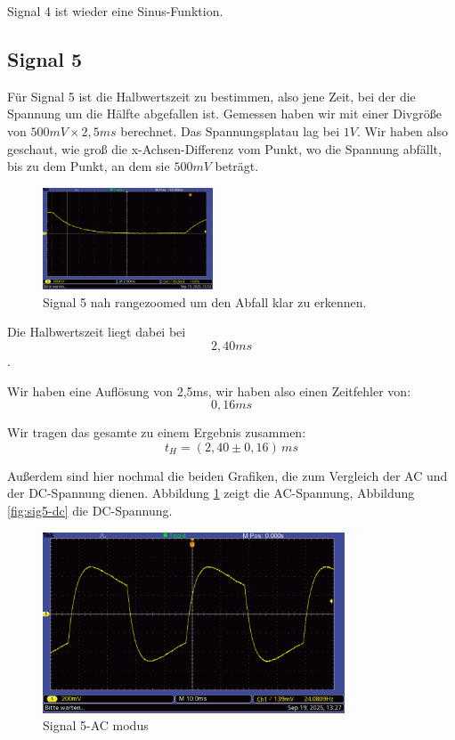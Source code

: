 Signal 4 ist wieder eine Sinus-Funktion.

\newpage

\subsection*{Signal 5}

Für Signal 5 ist die Halbwertszeit zu bestimmen, also jene Zeit, bei der die Spannung um die Hälfte abgefallen ist.
Gemessen haben wir mit einer Divgröße von $500mV \times 2,5ms$ berechnet. Das Spannungsplatau lag bei $1V$. Wir haben also geschaut, wie groß die x-Achsen-Differenz vom Punkt, wo die Spannung abfällt, bis zu dem Punkt, an dem sie $500mV$ beträgt.

\begin{figure} [h!]
    \centering
        \includegraphics[width=0.45\textwidth]{img/25/Signale2/Signal5-Clean.pdf}
    \caption{Signal 5 nah rangezoomed um den Abfall klar zu erkennen.}
\end{figure}

Die Halbwertszeit liegt dabei bei 
\begin{equation}
    2,40 ms
\end{equation}.

Wir haben eine Auflösung von 2,5ms, wir haben also einen Zeitfehler von:
\begin{equation}
    0,16 ms
\end{equation}

Wir tragen das gesamte zu einem Ergebnis zusammen:
\begin{equation}
\boxed{
    t_H = (2,40 \pm 0,16)\, ms
}
\end{equation}


Außerdem sind hier nochmal die beiden Grafiken, die zum Vergleich der AC und der DC-Spannung dienen. Abbildung \ref{fig:sig5-ac} zeigt die AC-Spannung, Abbildung \ref{fig:sig5-dc} die DC-Spannung.
\onecolumn
\begin{figure} [h!]
    \centering
        \includegraphics[width=0.8\textwidth]{img/25/Signale2/Signal5-AC.pdf}
    \caption{Signal 5-AC modus}
    \label{fig:sig5-ac}
\end{figure}

